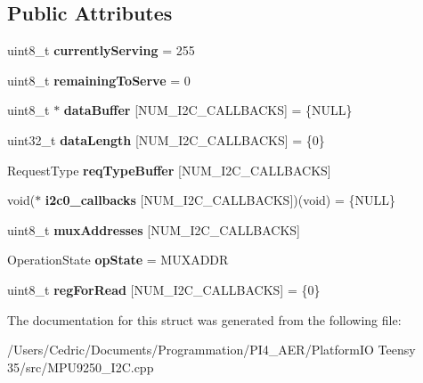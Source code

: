 \subsection*{Public Attributes}
\begin{DoxyCompactItemize}
\item 
\mbox{\label{struct_i2_c_serving_queue_abe2d0f40ba323e20988f64b19ac712d2}} 
uint8\+\_\+t {\bfseries currently\+Serving} = 255
\item 
\mbox{\label{struct_i2_c_serving_queue_a2cc67dbe2c2049bb5f19061042156450}} 
uint8\+\_\+t {\bfseries remaining\+To\+Serve} = 0
\item 
\mbox{\label{struct_i2_c_serving_queue_abe2cc8f031217ce2f65591ce1da92c94}} 
uint8\+\_\+t $\ast$ {\bfseries data\+Buffer} \mbox{[}N\+U\+M\+\_\+\+I2\+C\+\_\+\+C\+A\+L\+L\+B\+A\+C\+KS\mbox{]} = \{N\+U\+LL\}
\item 
\mbox{\label{struct_i2_c_serving_queue_aa4bd3aa340958232b2a826a4dccc7cba}} 
uint32\+\_\+t {\bfseries data\+Length} \mbox{[}N\+U\+M\+\_\+\+I2\+C\+\_\+\+C\+A\+L\+L\+B\+A\+C\+KS\mbox{]} = \{0\}
\item 
\mbox{\label{struct_i2_c_serving_queue_ab5864ad008fbf4f3e950a074041939be}} 
Request\+Type {\bfseries req\+Type\+Buffer} \mbox{[}N\+U\+M\+\_\+\+I2\+C\+\_\+\+C\+A\+L\+L\+B\+A\+C\+KS\mbox{]}
\item 
\mbox{\label{struct_i2_c_serving_queue_a63888171c724dc8928e9539d6c2b6400}} 
void($\ast$ {\bfseries i2c0\+\_\+callbacks} \mbox{[}N\+U\+M\+\_\+\+I2\+C\+\_\+\+C\+A\+L\+L\+B\+A\+C\+KS\mbox{]})(void) = \{N\+U\+LL\}
\item 
\mbox{\label{struct_i2_c_serving_queue_ad9dd8db93fef5b12622df408f035819c}} 
uint8\+\_\+t {\bfseries mux\+Addresses} \mbox{[}N\+U\+M\+\_\+\+I2\+C\+\_\+\+C\+A\+L\+L\+B\+A\+C\+KS\mbox{]}
\item 
\mbox{\label{struct_i2_c_serving_queue_acb7727f7b2ab688f5edc334d5a791ea3}} 
Operation\+State {\bfseries op\+State} = M\+U\+X\+A\+D\+DR
\item 
\mbox{\label{struct_i2_c_serving_queue_a682a63a94a6fc972667d28d145ec3c2f}} 
uint8\+\_\+t {\bfseries reg\+For\+Read} \mbox{[}N\+U\+M\+\_\+\+I2\+C\+\_\+\+C\+A\+L\+L\+B\+A\+C\+KS\mbox{]} = \{0\}
\end{DoxyCompactItemize}


The documentation for this struct was generated from the following file\+:\begin{DoxyCompactItemize}
\item 
/\+Users/\+Cedric/\+Documents/\+Programmation/\+P\+I4\+\_\+\+A\+E\+R/\+Platform\+I\+O Teensy 35/src/M\+P\+U9250\+\_\+\+I2\+C.\+cpp\end{DoxyCompactItemize}
